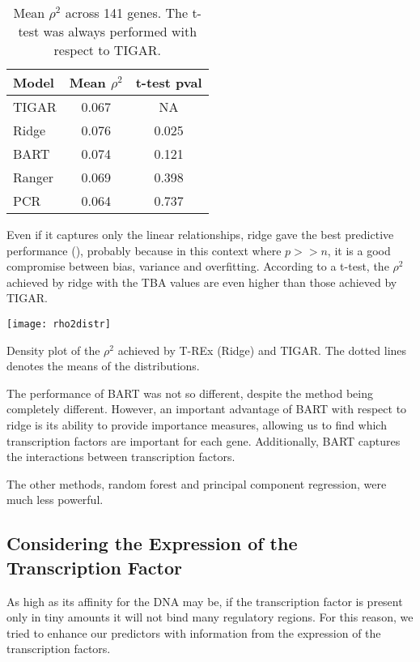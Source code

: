 \begin{table}[b]
  \caption{Mean $\rho^2$ across 141 genes. The t-test was always 
performed with respect to TIGAR.}
  \begin{tabular}{lcc}
  \textbf{Model} & \textbf{Mean} \boldmath$\rho^2$ & \textbf{t-test pval} \\
  \midrule
  TIGAR & 0.067 & NA\\
  Ridge & 0.076 & 0.025\\
  BART & 0.074 & 0.121\\
  Ranger & 0.069 & 0.398\\
  PCR & 0.064 & 0.737\\
  \end{tabular}
\end{table}

Even if it captures only the linear relationships, ridge gave the best 
predictive performance (), probably because in this 
context where $p >> n$, it is a good compromise between bias, variance 
and overfitting. According to a t-test, the $\rho^2$ achieved by ridge 
with the TBA values are even higher than those achieved by TIGAR.

\begin{marginfigure}[-2cm]
  \texttt{[image: rho2distr]}
  \caption{Density plot of the $\rho^2$ achieved by T-REx (Ridge) and 
TIGAR. The dotted lines denotes the means of the 
distributions.}
\end{marginfigure}

The performance of BART was not so different, despite the method being 
completely different. However, an important advantage of BART with 
respect to ridge is its ability to provide importance measures, allowing 
us to find which transcription factors are important for each gene. 
Additionally, BART captures the interactions between transcription 
factors.

The other methods, random forest and principal component regression, 
were much less powerful.

\subsection{Considering the Expression of the Transcription Factor}

As high as its affinity for the DNA may be, if the transcription factor 
is present only in tiny amounts it will not bind many regulatory 
regions. For this reason, we tried to enhance our predictors with 
information from the expression of the transcription factors.

